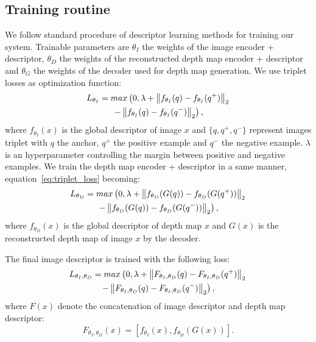 \subsection{Training routine}
\label{subsec:training}
We follow standard procedure of descriptor learning methods for training our system. Trainable parameters are $\theta_{I}$ the weights of the image encoder + descriptor, $\theta_{D}$ the weights of the reconstructed depth map encoder + descriptor and $\theta_{G}$ the weights of the decoder used for depth map generation. We use triplet losses as optimization function:
\begin{multline}
	\label{eq:triplet_loss}
	L_{\theta_{I}} = max\left(0, \lambda + \left\lVert f_{\theta_{I}}(q) - f_{\theta_{I}}(q^+)\right\rVert_2  \right. \\	
	\left. - \left\lVert f_{\theta_{I}}(q) - f_{\theta_{I}}(q^-)\right\rVert_2 \right),
\end{multline}
where $f_{\theta_{I}}(x)$ is the global descriptor of image $x$ and $\{q, q^+, q^-\}$ represent images triplet with $q$ the anchor, $q^+$ the positive example and $q^-$ the negative example. $\lambda$ is an hyperparameter controlling the margin between positive and negative examples. We train the depth map encoder + descriptor in a same manner, equation~\ref{eq:triplet_loss} becoming:
\begin{multline}
	\label{eq:depth_triplet_loss}
	L_{\theta_{D}}  = max\left(0, \lambda + \left\lVert f_{\theta_{D}}(G(q)) - f_{\theta_{D}}(G(q^+))\right\rVert_2  \right. \\	
	\left. - \left\lVert f_{\theta_{D}}(G(q)) - f_{\theta_{D}}(G(q^-))\right\rVert_2 \right),
\end{multline}
where $f_{\theta_{D}}(x)$ is the global descriptor of depth map $x$ and $G(x)$ is the reconstructed depth map of image $x$ by the decoder.

The final image descriptor is trained with the following loss:
\begin{multline}
	\label{eq:cat_triplet_loss}
	L_{\theta_{I},\theta_{D}} = max\left(0, \lambda + \left\lVert F_{\theta_{I},\theta_{D}}(q) - F_{\theta_{I},\theta_{D}}(q^+)\right\rVert_2  \right. \\	
	\left. - \left\lVert F_{\theta_{I},\theta_{D}}(q) - F_{\theta_{I},\theta_{D}}(q^-)\right\rVert_2 \right),
\end{multline}
where $F(x)$ denote the concatenation of image descriptor and depth map descriptor:
\begin{equation}
	\label{eq:cat_function}
	F_{\theta_{I},\theta_{D}}(x) = \left[ f_{\theta_{I}}(x), f_{\theta_{D}}(G(x)) \right].
\end{equation}

